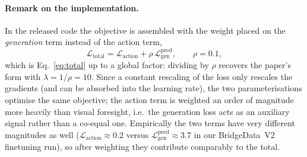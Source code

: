 \paragraph{Remark on the implementation.}
In the released code the objective is assembled with the weight placed on the
\emph{generation} term instead of the action term,
\begin{equation*}
    \mathcal{L}_{\mathrm{total}}
    = \mathcal{L}_{\mathrm{action}}
      + \rho \, \mathcal{L}^{\mathrm{pred}}_{\mathrm{gen}},
    \qquad \rho = 0.1 ,
\end{equation*}
which is Eq.~\eqref{eq:total} up to a global factor: dividing by $\rho$ recovers
the paper's form with $\lambda = 1/\rho = 10$. Since a constant rescaling of the
loss only rescales the gradients (and can be absorbed into the learning rate),
the two parameterisations optimise the same objective; the action term is
weighted an order of magnitude more heavily than visual foresight, i.e.\ the
generation loss acts as an auxiliary signal rather than a co-equal one.
Empirically the two terms have very different magnitudes as well
($\mathcal{L}_{\mathrm{action}}\approx 0.2$ versus
$\mathcal{L}^{\mathrm{pred}}_{\mathrm{gen}}\approx 3.7$ in our BridgeData~V2
finetuning run), so after weighting they contribute comparably to the total.
